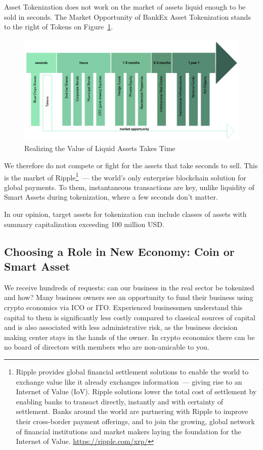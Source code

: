 \documentclass{article}
\begin{document}
\begin{multicols}{2}
Asset Tokenization does not work on the market of assets liquid enough to be sold in seconds. The Market Opportunity of BankEx Asset Tokenization stands to the right of Tokens on Figure~\ref{fig:liquidity-over-time}.

\begin{figure}
  \centering
  \includegraphics[width=\textwidth]{liquidity-over-time.png}
  \caption{Realizing the Value of Liquid Assets Takes Time}
  \label{fig:liquidity-over-time}
\end{figure}

We therefore do not compete or fight for the assets that take seconds to sell. This is the market of Ripple\footnote{Ripple provides global financial settlement solutions to enable the world to exchange value like it already exchanges information~--- giving rise to an Internet of Value (IoV). Ripple solutions lower the total cost of settlement by enabling banks to transact directly, instantly and with certainty of settlement. Banks around the world are partnering with Ripple to improve their cross-border payment offerings, and to join the growing, global network of financial institutions and market makers laying the foundation for the Internet of Value. \url{https://ripple.com/xrp/}}~--- the world’s only enterprise blockchain solution for global payments. To them, instantaneous transactions are key, unlike liquidity of Smart Assets during tokenization, where a few seconds don't matter.

In our opinion, target assets for tokenization can include classes of assets with summary capitalization exceeding 100 million USD. 

\subsection{Choosing a Role in New Economy: Coin or Smart Asset}

We receive hundreds of requests: can our business in the real sector be tokenized and how? Many business owners see an opportunity to fund their business using crypto economics via ICO or ITO. Experienced businessmen understand this capital to them is significantly less costly compared to classical sources of capital and is also associated with less administrative risk, as the business decision making center stays in the hands of the owner. In crypto economics there can be no board of directors with members who are non-amicable to you.  


\end{multicols}
\end{document}
